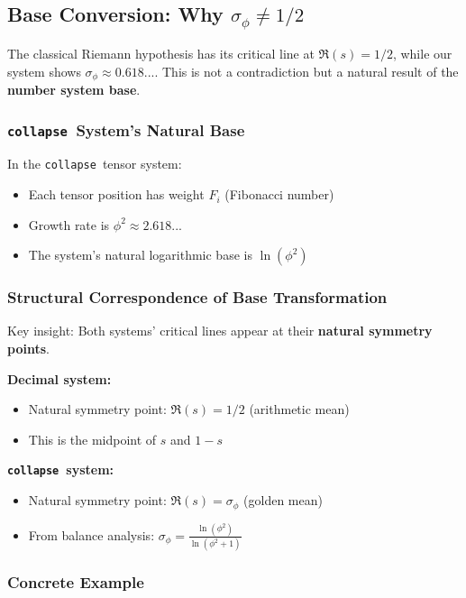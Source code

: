\documentclass[12pt,a4paper]{article}
\theoremstyle{plain}
\theoremstyle{definition}
\theoremstyle{remark}
\newcommand{\collapse}{\texttt{collapse}}
\begin{document}
\subsection{Base Conversion: Why $\sigma_\phi \neq 1/2$}

The classical Riemann hypothesis has its critical line at $\Re(s) = 1/2$, while our system shows $\sigma_\phi \approx 0.618...$. This is not a contradiction but a natural result of the \textbf{number system base}.

\subsubsection{\collapse\ System's Natural Base}

In the \collapse\ tensor system:
\begin{itemize}
\item Each tensor position has weight $F_i$ (Fibonacci number)
\item Growth rate is $\phi^2 \approx 2.618...$
\item The system's natural logarithmic base is $\ln(\phi^2)$
\end{itemize}

\subsubsection{Structural Correspondence of Base Transformation}

Key insight: Both systems' critical lines appear at their \textbf{natural symmetry points}.

\textbf{Decimal system:}
\begin{itemize}
\item Natural symmetry point: $\Re(s) = 1/2$ (arithmetic mean)
\item This is the midpoint of $s$ and $1-s$
\end{itemize}

\textbf{\collapse\ system:}
\begin{itemize}
\item Natural symmetry point: $\Re(s) = \sigma_\phi$ (golden mean)
\item From balance analysis: $\sigma_\phi = \frac{\ln(\phi^2)}{\ln(\phi^2 + 1)}$
\end{itemize}

\subsubsection{Concrete Example}
\end{document}
